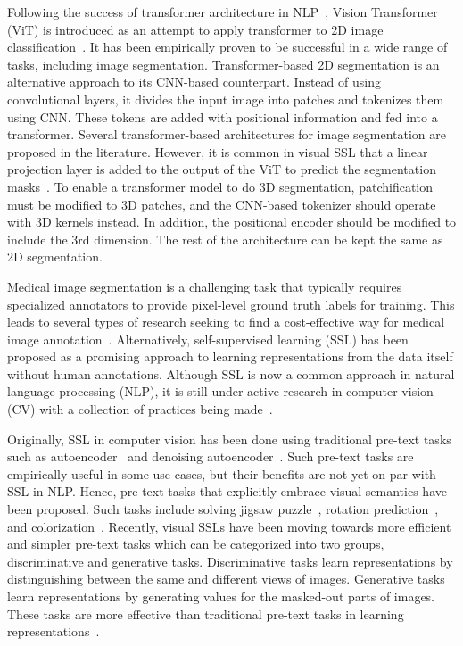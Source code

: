 \documentclass[a4paper,11pt,oneside]{report}
\begin{document}

Following the success of transformer architecture in NLP~\cite{Vaswani2017}, Vision Transformer (ViT) is introduced as an attempt to apply transformer to 2D image classification~\cite{Dosovitskiy2020vit}. It has been empirically proven to be successful in a wide range of tasks, including image segmentation. Transformer-based 2D segmentation is an alternative approach to its CNN-based counterpart. Instead of using convolutional layers, it divides the input image into patches and tokenizes them using CNN. These tokens are added with positional information and fed into a transformer. Several transformer-based architectures for image segmentation are proposed in the literature. However, it is common in visual SSL that a linear projection layer is added to the output of the ViT to predict the segmentation masks~\cite{Oquab2024dinov, Ranzinger2024RADIO}. To enable a transformer model to do 3D segmentation, patchification must be modified to 3D patches, and the CNN-based tokenizer should operate with 3D kernels instead. In addition, the positional encoder should be modified to include the 3rd dimension. The rest of the architecture can be kept the same as 2D segmentation.


Medical image segmentation is a challenging task that typically requires specialized annotators to provide pixel-level ground truth labels for training. This leads to several types of research seeking to find a cost-effective way for medical image annotation~\cite{Fu2012, Gal2017, Beluch2018, Rahimi2021}. Alternatively, self-supervised learning (SSL) has been proposed as a promising approach to learning representations from the data itself without human annotations. Although SSL is now a common approach in natural language processing (NLP), it is still under active research in computer vision (CV) with a collection of practices being made~\cite{Balestriero2023}. 

Originally, SSL in computer vision has been done using traditional pre-text tasks such as autoencoder~\cite{Hinton2006} and denoising autoencoder~\cite{Vincent2008}. Such pre-text tasks are empirically useful in some use cases, but their benefits are not yet on par with SSL in NLP. Hence, pre-text tasks that explicitly embrace visual semantics have been proposed. Such tasks include solving jigsaw puzzle~\cite{Noroozi2016}, rotation prediction~\cite{Gidaris2018}, and colorization~\cite{Larsson2017}. Recently, visual SSLs have been moving towards more efficient and simpler pre-text tasks which can be categorized into two groups, discriminative and generative tasks. Discriminative tasks learn representations by distinguishing between the same and different views of images. Generative tasks learn representations by generating values for the masked-out parts of images. These tasks are more effective than traditional pre-text tasks in learning representations~\cite{Chen2020Simple, He2020, He2022, Bao2022beit}.
\end{document}
